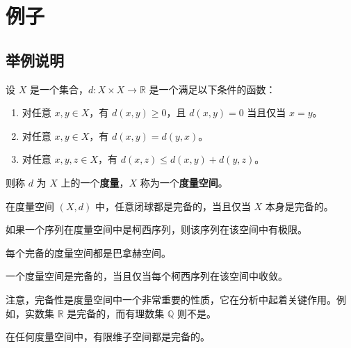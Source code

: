 \documentclass[12pt, a4paper, oneside, UTF8]{ctexbook}
\begin{document}
	\else
	\fi
	\chapter{例子}
	
	\section{举例说明}

	\begin{defn}
		设 $X$ 是一个集合，$d: X \times X \to \mathbb{R}$ 是一个满足以下条件的函数：
		\begin{enumerate}
			\item 对任意 $x, y \in X$，有 $d(x, y) \geq 0$，且 $d(x, y) = 0$ 当且仅当 $x = y$。
			\item 对任意 $x, y \in X$，有 $d(x, y) = d(y, x)$。
			\item 对任意 $x, y, z \in X$，有 $d(x, z) \leq d(x, y) + d(y, z)$。
		\end{enumerate}
		则称 $d$ 为 $X$ 上的一个\textbf{度量}，$X$ 称为一个\textbf{度量空间}。
	\end{defn}
	
	\begin{thm}
		在度量空间 $(X, d)$ 中，任意闭球都是完备的，当且仅当 $X$ 本身是完备的\cite{choy20194ds}。
	\end{thm}
	
	\begin{lemma}
		如果一个序列在度量空间中是柯西序列，则该序列在该空间中有极限。
	\end{lemma}
	
	\begin{corollary}
		每个完备的度量空间都是巴拿赫空间。
	\end{corollary}
	
	\begin{criterion}
		一个度量空间是完备的，当且仅当每个柯西序列在该空间中收敛。
	\end{criterion}
	
	\begin{rmk}
		注意，完备性是度量空间中一个非常重要的性质，它在分析中起着关键作用。例如，实数集 $\mathbb{R}$ 是完备的，而有理数集 $\mathbb{Q}$ 则不是。
	\end{rmk}
	
	\begin{proposition}
		在任何度量空间中，有限维子空间都是完备的。
	\end{proposition}
	
\end{document}
